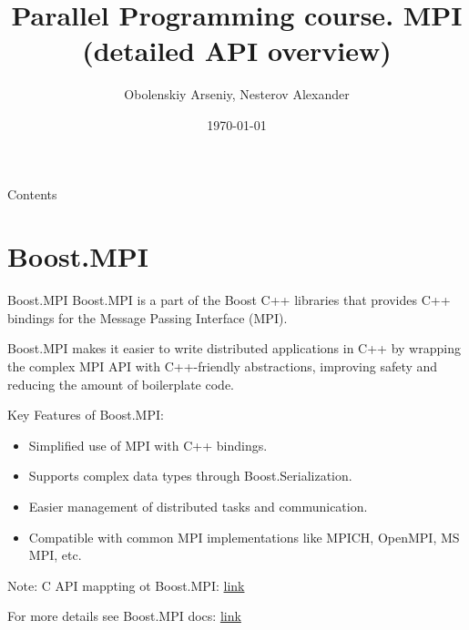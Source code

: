 \documentclass{beamer}
\title[Parallel Programming. MPI (detailed API overview)]{Parallel Programming course. MPI (detailed API overview)}
\author{Obolenskiy Arseniy, Nesterov Alexander}
\institute{Nizhny Novgorod State University}
\date{\today} %
\begin{document}
\begin{frame}
    \titlepage
\end{frame}

\begin{frame}{Contents}
    \tableofcontents
\end{frame}

\section{Boost.MPI}

\begin{frame}{Boost.MPI}
  Boost.MPI is a part of the Boost C++ libraries that provides C++ bindings for the Message Passing Interface (MPI).

  Boost.MPI makes it easier to write distributed applications in C++ by wrapping the complex MPI API with C++-friendly abstractions, improving safety and reducing the amount of boilerplate code.

  Key Features of Boost.MPI:
  \begin{itemize}
    \item Simplified use of MPI with C++ bindings.
    \item Supports complex data types through Boost.Serialization.
    \item Easier management of distributed tasks and communication.
    \item Compatible with common MPI implementations like MPICH, OpenMPI, MS MPI, etc.
  \end{itemize}

  Note: C API mappting ot Boost.MPI: \href{https://www.boost.org/doc/libs/1_86_0/doc/html/mpi/c_mapping.html}{link}

  {\footnotesize For more details see Boost.MPI docs: \href{https://www.boost.org/doc/libs/1_86_0/doc/html/mpi.html}{link}}
\end{frame}
\end{document}
